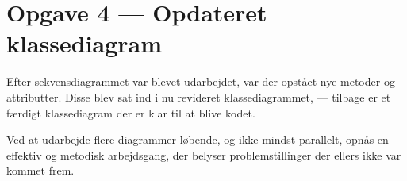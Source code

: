 \section{Opgave 4 --- Opdateret klassediagram}

Efter sekvensdiagrammet var blevet udarbejdet, var der opstået nye metoder og attributter. Disse blev sat ind i nu revideret klassediagrammet,  --- tilbage er et færdigt klassediagram der er klar til at blive kodet.

Ved at udarbejde flere diagrammer løbende, og ikke mindst parallelt, opnås en effektiv og metodisk arbejdsgang, der belyser problemstillinger der ellers ikke var kommet frem.